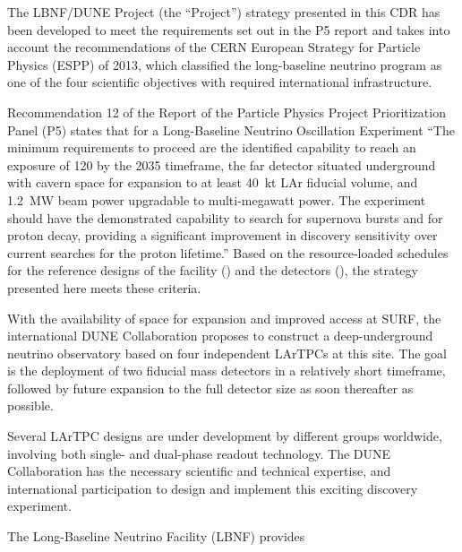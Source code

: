 The LBNF/DUNE Project (the ``Project'') strategy presented in this CDR has been developed to meet the requirements 
set out in the P5 report and %
takes into account the recommendations of the CERN European Strategy for Particle 
Physics (ESPP) of 2013, which classified the long-baseline neutrino program as 
one of the four scientific objectives with required international infrastructure.

Recommendation 12 of the Report of the Particle Physics Project Prioritization Panel (P5) 
states that for a Long-Baseline Neutrino Oscillation Experiment ``The 
minimum requirements to proceed are the identified capability to reach an exposure 
of \num{120}\ktMWyr{} by the 2035 timeframe, the far detector situated underground 
with cavern space for expansion to at least 40~kt LAr fiducial volume, and 1.2~MW 
beam power upgradable to multi-megawatt power. The experiment should have the demonstrated 
capability to search for supernova bursts and for proton decay, providing a significant 
improvement in discovery sensitivity over current searches for the proton lifetime.'' 
Based on the resource-loaded schedules for the reference designs of the facility (\vollbnf)
and the detectors (\voldune), the strategy presented here meets these criteria. 

With the availability of space for expansion and improved access at SURF, %
the international DUNE Collaboration proposes to construct a deep-underground neutrino observatory based on four independent  LArTPCs at this site. %
The goal is the deployment of two  fiducial mass detectors in a relatively short timeframe, followed by future expansion to the full detector size as soon thereafter as possible. 

Several LArTPC designs are under development by different groups worldwide, involving both single- and dual-phase readout technology.
The DUNE %
Collaboration has the necessary scientific and technical expertise, %
and international participation  to design and implement this exciting discovery experiment. 

The Long-Baseline Neutrino Facility (LBNF) provides

